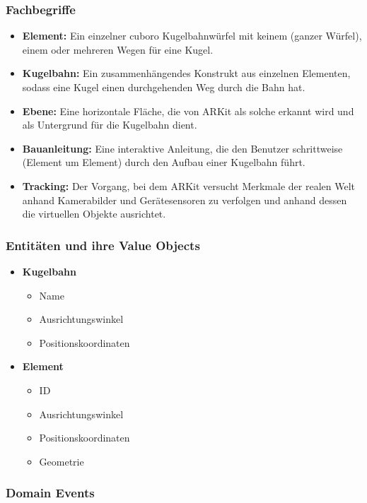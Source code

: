 \subsubsection{Fachbegriffe}

\begin{itemize}
	\item \textbf{Element:} Ein einzelner cuboro Kugelbahnwürfel mit keinem (ganzer Würfel), einem oder mehreren Wegen für eine Kugel.
	\item \textbf{Kugelbahn:} Ein zusammenhängendes Konstrukt aus einzelnen Elementen, sodass eine Kugel einen durchgehenden Weg durch die Bahn hat.
	\item \textbf{Ebene:} Eine horizontale Fläche, die von ARKit als solche erkannt wird und als Untergrund für die Kugelbahn dient.
	\item \textbf{Bauanleitung:} Eine interaktive Anleitung, die den Benutzer schrittweise (Element um Element) durch den Aufbau einer Kugelbahn führt.
	\item \textbf{Tracking:} Der Vorgang, bei dem ARKit versucht Merkmale der realen Welt anhand Kamerabilder und Gerätesensoren zu verfolgen und anhand dessen die virtuellen Objekte ausrichtet.
\end{itemize}

\subsubsection{Entitäten und ihre Value Objects}

\begin{itemize}
	\item \textbf{Kugelbahn}
	\begin{itemize}
		\item Name
		\item Ausrichtungswinkel
		\item Positionskoordinaten
	\end{itemize}
	\item \textbf{Element}
	\begin{itemize}
		\item ID
		\item Ausrichtungswinkel
		\item Positionskoordinaten
		\item Geometrie
	\end{itemize}
\end{itemize}

\subsubsection{Domain Events}

